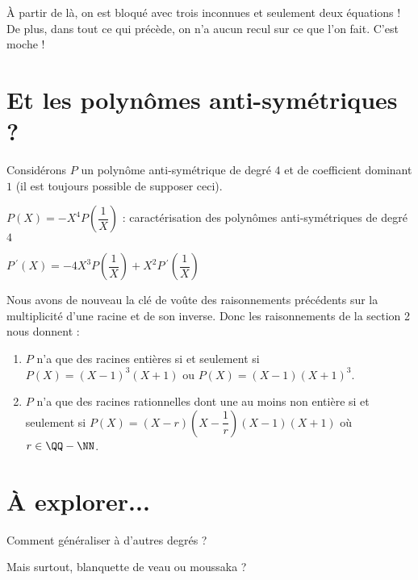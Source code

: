 \documentclass[12pt]{amsart}
\begin{document}
À partir de là, on est bloqué avec trois inconnues et seulement deux équations ! De plus, dans tout ce qui précède, on n'a aucun recul sur ce que l'on fait. C'est moche !



\section{Et les polynômes anti-symétriques ?}

Considérons $P$ un polynôme anti-symétrique de degré $4$ et de coefficient dominant $1$ (il est toujours possible de supposer ceci).

\medskip

$P(X) = -X^4 P\left( \dfrac1X \right)$ : caractérisation des polynômes anti-symétriques de degré $4$

\medskip

$P\,^{\prime}(X) = - 4 X^3 P\left( \dfrac1X \right) 
            + X^2 P\,^{\prime}\left( \dfrac1X \right)$


\medskip

Nous avons de nouveau la clé de voûte des raisonnements précédents sur la multiplicité d'une racine et de son inverse.
Donc les raisonnements de la section 2 nous donnent :

\begin{enumerate}
	\item $P$ n'a que des racines entières si et seulement si $P(X) = (X - 1)^3 (X + 1)$ ou $P(X) = (X - 1) (X + 1)^3$.

	\item $P$ n'a que des racines rationnelles dont une au moins non entière si et seulement si $P(X) = (X - r) \left( X - \dfrac1r \right) (X - 1) (X + 1)$ où $r \in \QQ - \NN$.
\end{enumerate}




\section{À explorer...}

Comment généraliser à d'autres degrés ?

\medskip

Mais surtout, blanquette de veau ou moussaka ?
\end{document}

